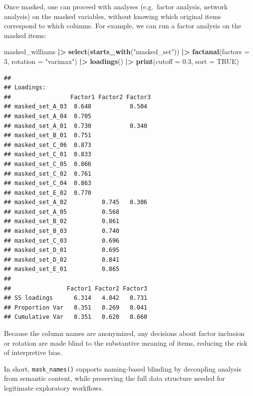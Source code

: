 \documentclass[
  english,
  man,floatsintext]{apa6}
\newenvironment{Shaded}{\begin{snugshade}}{\end{snugshade}}
\newcommand{\AttributeTok}[1]{\textcolor[rgb]{0.13,0.29,0.53}{#1}}
\newcommand{\ConstantTok}[1]{\textcolor[rgb]{0.56,0.35,0.01}{#1}}
\newcommand{\DecValTok}[1]{\textcolor[rgb]{0.00,0.00,0.81}{#1}}
\newcommand{\FloatTok}[1]{\textcolor[rgb]{0.00,0.00,0.81}{#1}}
\newcommand{\FunctionTok}[1]{\textcolor[rgb]{0.13,0.29,0.53}{\textbf{#1}}}
\newcommand{\NormalTok}[1]{#1}
\newcommand{\SpecialCharTok}[1]{\textcolor[rgb]{0.81,0.36,0.00}{\textbf{#1}}}
\newcommand{\StringTok}[1]{\textcolor[rgb]{0.31,0.60,0.02}{#1}}
\begin{document}
Once masked, one can proceed with analyses (e.g.~factor analysis, network analysis) on the masked variables, without knowing which original items correspond to which columns. For example, we can run a factor analysis on the masked items:

\begin{Shaded}
\begin{Highlighting}[]
\NormalTok{masked\_williams }\SpecialCharTok{|\textgreater{}} 
  \FunctionTok{select}\NormalTok{(}\FunctionTok{starts\_with}\NormalTok{(}\StringTok{"masked\_set"}\NormalTok{)) }\SpecialCharTok{|\textgreater{}} 
  \FunctionTok{factanal}\NormalTok{(}\AttributeTok{factors =} \DecValTok{3}\NormalTok{, }\AttributeTok{rotation =} \StringTok{"varimax"}\NormalTok{) }\SpecialCharTok{|\textgreater{}} 
  \FunctionTok{loadings}\NormalTok{() }\SpecialCharTok{|\textgreater{}} 
  \FunctionTok{print}\NormalTok{(}\AttributeTok{cutoff =} \FloatTok{0.3}\NormalTok{, }\AttributeTok{sort =} \ConstantTok{TRUE}\NormalTok{)}
\end{Highlighting}
\end{Shaded}

\begin{verbatim}
## 
## Loadings:
##                 Factor1 Factor2 Factor3
## masked_set_A_03  0.648           0.504 
## masked_set_A_04  0.705                 
## masked_set_A_01  0.730           0.340 
## masked_set_B_01  0.751                 
## masked_set_C_06  0.873                 
## masked_set_C_01  0.833                 
## masked_set_C_05  0.866                 
## masked_set_C_02  0.761                 
## masked_set_C_04  0.863                 
## masked_set_E_02  0.770                 
## masked_set_A_02          0.745   0.306 
## masked_set_A_05          0.568         
## masked_set_B_02          0.861         
## masked_set_B_03          0.740         
## masked_set_C_03          0.696         
## masked_set_D_01          0.695         
## masked_set_D_02          0.841         
## masked_set_E_01          0.865         
## 
##                Factor1 Factor2 Factor3
## SS loadings      6.314   4.842   0.731
## Proportion Var   0.351   0.269   0.041
## Cumulative Var   0.351   0.620   0.660
\end{verbatim}

Because the column names are anonymized, any decisions about factor inclusion or rotation are made blind to the substantive meaning of items, reducing the risk of interpretive bias.

In short, \texttt{mask\_names()} supports naming-based blinding by decoupling analysis from semantic content, while preserving the full data structure needed for legitimate exploratory workflows.
\end{document}
